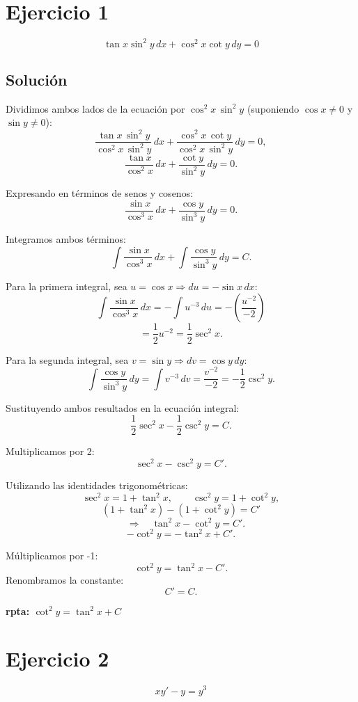 \documentclass[12pt,a4paper]{article}
\begin{document}
\begin{multicols}{2}
  

\section*{Ejercicio 1}
\[\tan x \sin^2 y \, dx + \cos^2 x \cot y \, dy = 0\]
\subsection*{Solución}
Dividimos ambos lados de la ecuación por $\cos^{2}x \, \sin^{2}y$ (suponiendo $\cos x \neq 0$ y $\sin y \neq 0$):
\[
\frac{\tan x \, \sin^{2}y}{\cos^{2}x \, \sin^{2}y} \, dx 
+ 
\frac{\cos^{2}x \, \cot y}{\cos^{2}x \, \sin^{2}y} \, dy = 0,
\]
\[
\frac{\tan x}{\cos^{2}x} \, dx + \frac{\cot y}{\sin^{2}y} \, dy = 0.
\]

Expresando en términos de senos y cosenos:
\[
\frac{\sin x}{\cos^{3}x} \, dx + \frac{\cos y}{\sin^{3}y} \, dy = 0.
\]

Integramos ambos términos:
\[
\int \frac{\sin x}{\cos^{3}x} \, dx + \int \frac{\cos y}{\sin^{3}y} \, dy = C.
\]

\noindent
Para la primera integral, sea $u = \cos x \Rightarrow du = -\sin x \, dx$:
\[
\int \frac{\sin x}{\cos^{3}x} \, dx 
= -\int u^{-3} \, du 
= -\left( \frac{u^{-2}}{-2} \right)
\]
\[
= \frac{1}{2}u^{-2}
= \frac{1}{2}\sec^{2}x.
\]

\noindent
Para la segunda integral, sea $v = \sin y \Rightarrow dv = \cos y \, dy$:
\[
\int \frac{\cos y}{\sin^{3}y} \, dy
= \int v^{-3} \, dv
= \frac{v^{-2}}{-2}
= -\frac{1}{2}\csc^{2}y.
\]

Sustituyendo ambos resultados en la ecuación integral:
\[
\frac{1}{2}\sec^{2}x - \frac{1}{2}\csc^{2}y = C.
\]

Multiplicamos por 2:
\[
\sec^{2}x - \csc^{2}y = C'.
\]

Utilizando las identidades trigonométricas:
\[
\sec^{2}x = 1 + \tan^{2}x, 
\qquad 
\csc^{2}y = 1 + \cot^{2}y,
\]
\[
(1+\tan^{2}x) - (1+\cot^{2}y) = C'
\]
\[
\quad \Rightarrow \quad
\tan^{2}x - \cot^{2}y = C'.
\]
\[
 - \cot^{2}y = - \tan^{2}x + C'.
\]

Múltiplicamos por -1:
\[
\cot^{2}y = \tan^{2}x - C'.
\]
Renombramos la constante:
\[
C' = C.
\]

\textbf{rpta: $\cot^{2}y = \tan^{2}x + C$}

\section*{Ejercicio 2}
\[xy\prime -y=y^3\]


\end{multicols}
\end{document}
